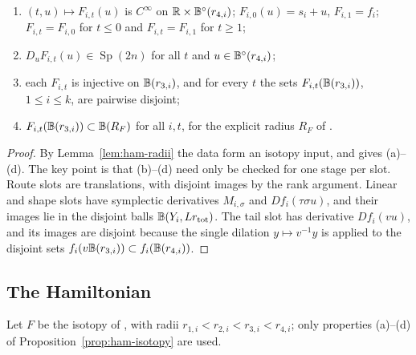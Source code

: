 \begin{proposition}\label{prop:ham-isotopy}
\begin{enumerate}[label=(\alph*)]
\item $(t,u)\mapsto F_{i,t}(u)$ is $C^\infty$ on $\mathbb{R}\times\mathbb{B}^\circ(r_{4,i})$; $F_{i,0}(u)=s_i+u$, $F_{i,1}=f_i$;
 $F_{i,t}=F_{i,0}$ for $t\le0$ and $F_{i,t}=F_{i,1}$ for $t\ge1$;
\item $D_uF_{i,t}(u)\in\operatorname{Sp}(2n)$ for all $t$ and $u\in\mathbb{B}^\circ(r_{4,i})$;
\item each $F_{i,t}$ is injective on $\mathbb{B}(r_{3,i})$, and for every $t$ the sets $F_{i,t}(\mathbb{B}(r_{3,i}))$, $1\le i\le k$, are
 pairwise disjoint;
\item $F_{i,t}(\mathbb{B}(r_{3,i}))\subset\mathbb{B}(R_F)$ for all $i,t$, for the explicit radius $R_F$ of .
\end{enumerate}
\end{proposition}

\begin{proof}
By Lemma~\ref{lem:ham-radii} the data form an isotopy input, and  gives (a)--(d). The key point is that (b)--(d) need only be checked for one stage per slot. Route slots are translations, with disjoint images by the rank argument. Linear and shape slots have symplectic derivatives $M_{i,\sigma}$ and $Df_i(\tau\sigma u)$, and their images lie in the disjoint balls $\mathbb{B}(Y_i,Lr_{\rm tot})$. The tail slot has derivative $Df_i(vu)$, and its images are disjoint because the single dilation $y\mapsto v^{-1}y$ is applied to the disjoint sets $f_i(v\mathbb{B}(r_{3,i}))\subset f_i(\mathbb{B}(r_{4,i}))$.
\end{proof}

\subsection{The Hamiltonian}\label{sec:ham-hamiltonian}

Let $F$ be the isotopy of , with radii $r_{1,i}<r_{2,i}<r_{3,i}<r_{4,i}$; only properties (a)--(d) of Proposition~\ref{prop:ham-isotopy} are used.

